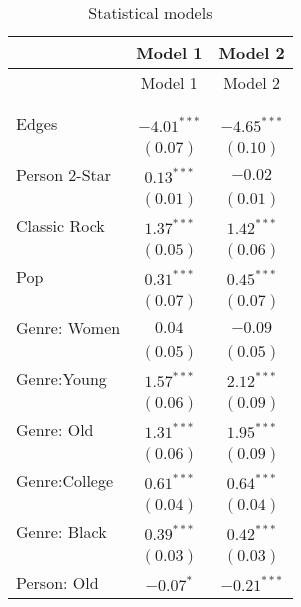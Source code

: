 
\begin{center}
\begin{longtable}{l c c}
\toprule
 & Model 1 & Model 2 \\
\midrule
\endfirsthead
\toprule
 & Model 1 & Model 2 \\
\midrule
\endhead
\bottomrule
\endfoot
\bottomrule
\multicolumn{3}{l}{\scriptsize{$^{***}p<0.001$; $^{**}p<0.01$; $^{*}p<0.05$}}\\
\caption{Statistical models}
\label{table:coefficients}
\endlastfoot \\
Edges                             & $-4.01^{***}$ & $-4.65^{***}$ \\
                                  & $(0.07)$      & $(0.10)$      \\
Person 2-Star                     & $0.13^{***}$  & $-0.02$       \\
                                  & $(0.01)$      & $(0.01)$      \\
Classic Rock                      & $1.37^{***}$  & $1.42^{***}$  \\
                                  & $(0.05)$      & $(0.06)$      \\
Pop                               & $0.31^{***}$  & $0.45^{***}$  \\
                                  & $(0.07)$      & $(0.07)$      \\
Genre: Women                      & $0.04$        & $-0.09$       \\
                                  & $(0.05)$      & $(0.05)$      \\
Genre:Young                       & $1.57^{***}$  & $2.12^{***}$  \\
                                  & $(0.06)$      & $(0.09)$      \\
Genre: Old                        & $1.31^{***}$  & $1.95^{***}$  \\
                                  & $(0.06)$      & $(0.09)$      \\
Genre:College                     & $0.61^{***}$  & $0.64^{***}$  \\
                                  & $(0.04)$      & $(0.04)$      \\
Genre: Black                      & $0.39^{***}$  & $0.42^{***}$  \\
                                  & $(0.03)$      & $(0.03)$      \\
Person: Old                       & $-0.07^{*}$   & $-0.21^{***}$ \\

\end{longtable}
\end{center}
